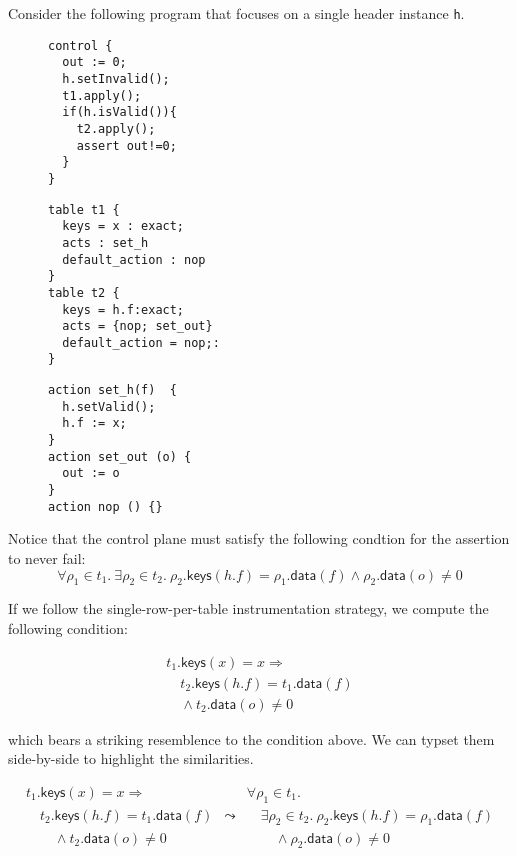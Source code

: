 \documentclass{article}
\newcommand{\MatchRow}{\mathsf{keys}}
\newcommand{\ActionDataRow}{\mathsf{data}}
\begin{document}
Consider the following program that focuses on a single header instance \texttt{h}.
\begin{figure}[H]
  \begin{minipage}{0.32\textwidth}
\begin{verbatim}
control {
  out := 0;
  h.setInvalid();
  t1.apply();
  if(h.isValid()){
    t2.apply();
    assert out!=0;
  }
}
\end{verbatim}
  \end{minipage} \begin{minipage}{0.39\textwidth}
\begin{verbatim}
table t1 {
  keys = x : exact;
  acts : set_h
  default_action : nop
}
table t2 {
  keys = h.f:exact;
  acts = {nop; set_out}
  default_action = nop;:
}
\end{verbatim}
  \end{minipage} \begin{minipage}{0.27\textwidth}
\begin{verbatim}
action set_h(f)  {
  h.setValid();
  h.f := x;
}
action set_out (o) {
  out := o
}
action nop () {}
\end{verbatim}
\end{minipage}
\end{figure}

Notice that the control plane must satisfy the following condtion for the assertion to never fail:
\[ \forall \rho_1 \in t_1.~\exists \rho_2 \in t_2.~\rho_2.\MatchRow(h.f) = \rho_1.\ActionDataRow(f) \wedge \rho_2.\ActionDataRow(o) \neq 0 \]

If we follow the single-row-per-table instrumentation strategy, we compute the
following condition:

\[\begin{array}{l}
t_1.\MatchRow(x) = x \Rightarrow \\
\quad t_2.\MatchRow(h.f) = t_1.\ActionDataRow(f) \\
\quad \wedge t_2.\ActionDataRow(o) \neq 0
\end{array}\]

which bears a striking resemblence to the condition above. We can typset them side-by-side to highlight the similarities.

\[\begin{array}{lcl}
t_1.\MatchRow(x) = x \Rightarrow && \forall \rho_1 \in t_1. \\
\quad t_2.\MatchRow(h.f) = t_1.\ActionDataRow(f) & \leadsto & \quad \exists \rho_2 \in t_2.~\rho_2.\MatchRow(h.f) = \rho_1.\ActionDataRow(f) \\
\qquad \wedge t_2.\ActionDataRow(o) \neq 0 && \qquad \wedge\rho_2.\ActionDataRow(o) \neq 0
\end{array}
\]
\end{document}

